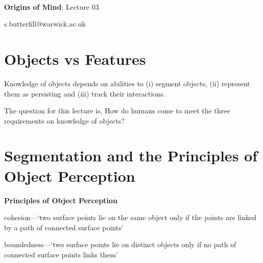 \documentclass[12pt]{extarticle}
\date{}
\makeatletter
\def \ititle {Origins of Mind}
\def \isubtitle {Lecture 02}
\def \iemail{s.butterfill@warwick.ac.uk}
\makeatother
\begin{document}
\begin{multicols}{3}

\setlength\footnotesep{1em}









\def \ititle {Origins of Mind}
 
\def \isubtitle {Lecture 03}
 
 
 
\
 
 
 
\begin{center}
 
{\Large
 
\textbf{\ititle}: \isubtitle
 
}
 
 
 
\iemail %
 
\end{center}
 
 
 
\section{Objects vs Features}
 
Knowledge of objects depends on abilities to (i) segment objects, (ii) represent them as persisting and (iii) track their interactions.
 
The question for this lecture is, How do humans come to meet the three requirements on knowledge of objects?
 
 
 
\section{Segmentation and the Principles of Object Perception}
 
\textbf{Principles of Object Perception \citep{Spelke:1990jn}}
 
cohesion—‘two surface points lie on the same object only if the points are linked by a path of connected surface points’
 
boundedness—‘two surface points lie on distinct objects only if no path of connected surface points links them’
 

\end{multicols}
\end{document}
